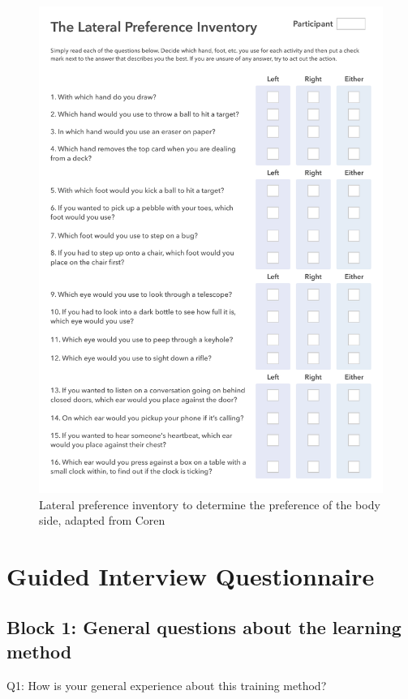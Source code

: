 \begin{appendices}
\begin{figure}[htb]
	\centering
	\begin{minipage}[t]{1\linewidth}
		\centering
		\includegraphics[width=1\linewidth]{Pictures/App_LateralPreference}
		\caption{Lateral preference inventory to determine the preference of the body side, adapted from Coren~\cite{Coren1993-lp}}
		\label{fig:App_DemographicDataHTG}
	\end{minipage}
\end{figure}

\clearpage

\section*{Guided Interview Questionnaire}

\subsection*{Block 1: General questions about the learning method}
Q1: How is your general experience about this training method?


\end{appendices}
